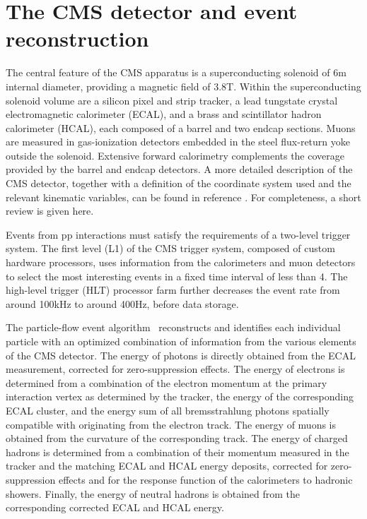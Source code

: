 \section{The CMS detector and event reconstruction}
\label{sect:CMSRec}
The central feature of the CMS apparatus is a superconducting solenoid of 6\unit{m} internal diameter, providing a magnetic field of 3.8\unit{T}. Within the superconducting solenoid volume are a silicon pixel and strip tracker, a lead tungstate crystal electromagnetic calorimeter (ECAL), and a brass and scintillator hadron calorimeter (HCAL), each composed of a barrel and two endcap sections. Muons are measured in gas-ionization detectors embedded in the steel flux-return yoke outside the solenoid. Extensive forward calorimetry complements the coverage provided by the barrel and endcap detectors. 
A more detailed description of the CMS detector, together with a definition of the coordinate system used and the relevant kinematic variables, can be found in reference \cite{Chatrchyan:2008zzk}.
For completeness, a short review is given here. 


Events from pp interactions must satisfy the requirements of a two-level trigger system.
The first level (L1) of the CMS trigger system, composed of custom hardware processors, uses information from the calorimeters and muon detectors to select the most interesting events in a fixed time interval of less than 4\mus. The high-level trigger (HLT) processor farm further decreases the event rate from around 100\unit{kHz} to around 400\unit{Hz}, before data storage. 

The particle-flow event algorithm~\cite{CMS-PAS-PFT-09-001,CMS-PAS-PFT-10-001} reconstructs and identifies each individual particle with an optimized combination of information from the various elements of the CMS detector. The energy of photons is directly obtained from the ECAL measurement, corrected for zero-suppression effects. The energy of electrons is determined from a combination of the electron momentum at the primary interaction vertex as determined by the tracker, the energy of the corresponding ECAL cluster, and the energy sum of all bremsstrahlung photons spatially compatible with originating from the electron track. The energy of muons is obtained from the curvature of the corresponding track. The energy of charged hadrons is determined from a combination of their momentum measured in the tracker and the matching ECAL and HCAL energy deposits, corrected for zero-suppression effects and for the response function of the calorimeters to hadronic showers. Finally, the energy of neutral hadrons is obtained from the corresponding corrected ECAL and HCAL energy. 

